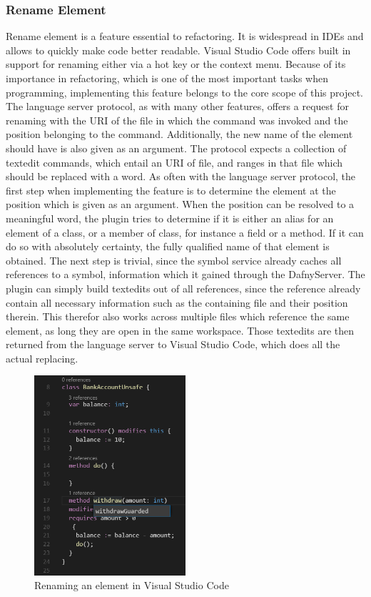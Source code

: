 \subsubsection{Rename Element} \label{renameelement}
Rename element is a feature essential to refactoring. It is widespread in IDEs and allows to quickly make code better readable. Visual Studio Code offers built in support for renaming either via a hot key or the context menu. \newline
Because of its importance in refactoring, which is one of the most important tasks when programming, implementing this feature belongs to the core scope of this project. \newline
The language server protocol, as with many other features, offers a request for renaming with the URI of the file in which the command was invoked and the position belonging to the command. Additionally, the new name of the element should have is also given as an argument. The protocol expects a collection of textedit commands, which entail an URI of file, and ranges in that file which should be replaced with a word. \newline
As often with the language server protocol, the first step when implementing the feature is to determine the element at the position which is given as an argument. When the position can be resolved to a meaningful word, the plugin tries to determine if it is either an alias for an element of a class, or a member of class, for instance a field or a method. If it can do so with absolutely certainty, the fully qualified name of that element is obtained. The next step is trivial, since the symbol service already caches all references to a symbol, information which it gained through the DafnyServer. The plugin can simply build textedits out of all references, since the reference already contain all necessary information such as the containing file and their position therein. This therefor also works across multiple files which reference the same element, as long they are open in the same workspace. Those textedits are then returned from the language server to Visual Studio Code, which does all the actual replacing. \newline
  \begin{figure}[H]
 	\centering
 	\includegraphics[width=0.5\textwidth]{img/rename}
 	\caption{Renaming an element in Visual Studio Code}
 	\label{fig:rename}
 \end{figure}
